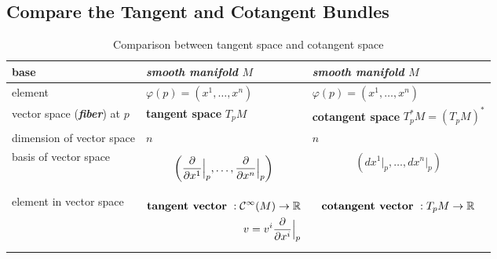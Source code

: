 \documentclass[11pt]{article}
\begin{document}
\newpage
\subsection{Compare the Tangent and Cotangent Bundles}
\begin{table}[h!]
\setlength{\abovedisplayskip}{0pt}
\setlength{\belowdisplayskip}{-10pt}
\setlength{\abovedisplayshortskip}{0pt}
\setlength{\belowdisplayshortskip}{0pt}
\centering
\caption{Comparison between tangent space and cotangent space}
\label{tab: tangent_cotangent}
\renewcommand\tabularxcolumn[1]{m{#1}}
\footnotesize
\begin{tabularx}{1\textwidth} { 
  | >{\raggedright\arraybackslash} m{2cm}
  | >{\centering\arraybackslash}X
  | >{\centering\arraybackslash}X  | }
 \hline
 base &  \emph{\textbf{smooth manifold}} $M$ & \emph{\textbf{smooth manifold}} $M$  \\
 \hline
 element  & $\varphi(p) = (x^1, \ldots, x^{n})$ & $\varphi(p) = (x^1, \ldots, x^{n})$\\
\hline
vector space (\emph{\textbf{fiber}}) at $p$ &  \textbf{tangent space}  $T_{p}M$ &  \textbf{cotangent space} $T_{p}^{*}M = (T_{p}M)^{*}$ \\
\hline
dimension of vector space & $n$ & $n$  \\
\hline
basis of vector space & 
\vspace{-1.25em}
\begin{align*}
 \left(\dfrac{\partial}{\partial x^{1}}\Bigr|_{p}, \ldots, \dfrac{\partial}{\partial x^{n}}\Bigr|_{p}\right)
\end{align*}
\vspace{-1em}
 &   
\vspace{-1.25em}
\begin{align*}
 (dx^1\bigr|_{p}, \ldots, dx^n\bigr|_{p})
\end{align*} \vspace{-1em}\\
\hline
element in vector space   &
\vspace{-1.25em}
 \begin{align*} 
\text{\textbf{tangent vector} }:{\mathcal C}^{\infty}(M) \rightarrow {\mathbb R}\\
  v = v^{i}\dfrac{\partial}{\partial x^{i}}\Bigr|_{p}
 \end{align*} \vspace{-1em}  & 
\vspace{-1.25em} 
 \begin{align*} 
 \text{\textbf{cotangent vector} }:T_pM \rightarrow \bR\\

\end{align*}
\end{tabularx}
\end{table}
\end{document}
